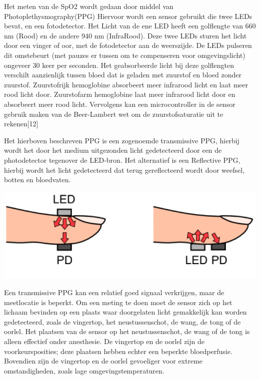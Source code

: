 \documentclass[11pt]{article}
\begin{document}
    Het meten van de SpO2 wordt gedaan door middel van Photoplethysmography(PPG) Hiervoor wordt een sensor gebruikt die twee LEDs bevat, en een fotodetector. 
    Het Licht van de ene LED heeft een golflengte van 660 nm (Rood) en de andere 940 nm (InfraRood). Deze twee LEDs sturen het licht door een vinger of oor, met de fotodetector aan de weerszijde. 
    De LEDs pulseren dit omstebeurt (met pauzes er tussen om te compenseren voor omgevingslicht) ongeveer 30 keer per seconden. 
    Het geabsorbeerde licht bij deze golflengten verschilt aanzienlijk tussen bloed dat is geladen met zuurstof en bloed zonder zuurstof. 
    Zuurstofrijk hemoglobine absorbeert meer infrarood licht en laat meer rood licht door. Zuurstofarm hemoglobine laat meer infrarood licht door en absorbeert meer rood licht. 
    Vervolgens kan een microcontroller in de sensor gebruik maken van de Beer-Lambert wet om de zuurstofsaturatie uit te rekenen[12]

    Het hierboven beschreven PPG is een zogenoemde transmissive PPG, hierbij wordt het door het medium uitgezonden licht gedetecteerd door een de photodetector tegenover de LED-bron. 
    Het alternatief is een Reflective PPG, hierbij wordt het licht gedetecteerd dat terug gereflecteerd wordt door weefsel, botten en bloedvaten.

    
    \includegraphics[height=0.2\textheight]{Images/Tamura1.png}

    \citet{tekano2007heart}

    Een transmissive PPG kan een relatief goed signaal verkrijgen, maar de meetlocatie is beperkt. 
    Om een meting te doen moet de sensor zich op het lichaam bevinden op een plaats waar doorgelaten licht gemakkelijk kan worden gedetecteerd, zoals de vingertop, het neustussenschot, de wang, de tong of de oorlel. 
    Het plaatsen van de sensor op het neustussenschot, de wang of de tong is alleen effectief onder anesthesie. 
    De vingertop en de oorlel zijn de voorkeursposities; deze plaatsen hebben echter een beperkte bloedperfusie. 
    Bovendien zijn de vingertop en de oorlel gevoeliger voor extreme omstandigheden, zoals lage omgevingstemperaturen.
\end{document}
